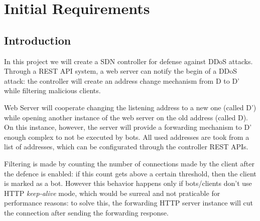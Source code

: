 \chapter{Initial Requirements}

\section{Introduction}
In this project we will create a SDN controller for defense against DDoS attacks. Through a REST API system, a web server can notify the begin of a DDoS attack: the controller will create an address change mechanism from D to D’ while filtering malicious clients.

Web Server will cooperate changing the listening address to a new one (called D') while opening another instance of the web server on the old address (called D). On this instance, however, the server will provide a forwarding mechanism to D' enough complex to not be executed by bots.
All used addresses are took from a list of addresses, which can be configurated through the controller REST APIs.

Filtering is made by counting the number of connections made by the client after the defence is enabled: if this count gets above a certain threshold, then the client is marked as a bot. However this behavior happens only if bots/clients don't use HTTP \textit{keep-alive} mode, which would be surreal and not praticable for performance reasons: to solve this, the forwarding HTTP server instance will cut the connection after sending the forwarding response.


